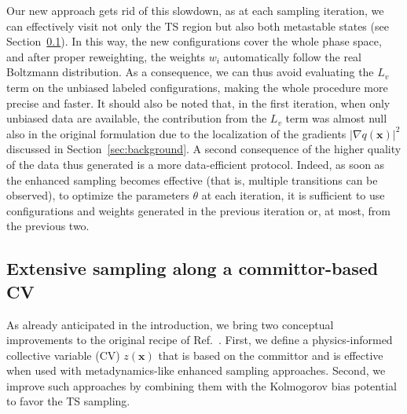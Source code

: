         Our new approach gets rid of this slowdown, as at each sampling iteration, we can effectively visit not only the TS region but also both metastable states (see Section~\ref{sec:committor_cv}).
        In this way, the new configurations cover the whole phase space, and after proper reweighting, the weights $w_i$ automatically follow the real Boltzmann distribution.
        As a consequence, we can thus avoid evaluating the $L_v$ term on the unbiased labeled configurations, making the whole procedure more precise and faster. 
        It should also be noted that, in the first iteration, when only unbiased data are available, the contribution from the $L_v$ term was almost null also in the original formulation due to the localization of the gradients $|\nabla q(\textbf{x}) |^2$ discussed in Section~\ref{sec:background}.
        A second consequence of the higher quality of the data thus generated is a more data-efficient protocol.
        Indeed, as soon as the enhanced sampling becomes effective (that is, multiple transitions can be observed), to optimize the parameters $\theta$ at each iteration, it is sufficient to use configurations and weights generated in the previous iteration or, at most, from the previous two.
        
\subsection{Extensive sampling along a committor-based CV}
    \label{sec:committor_cv}
        As already anticipated in the introduction, we bring two conceptual improvements to the original recipe of Ref.~.
        First, we define a physics-informed collective variable (CV) $z(\textbf{x})$ that is based on the committor and is effective when used with metadynamics-like enhanced sampling approaches.
        Second, we improve such approaches by combining them with the Kolmogorov bias potential to favor the TS sampling.

